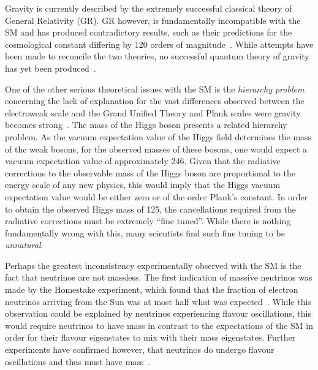 Gravity is currently described by the extremely successful classical theory of General Relativity (GR).
GR however, is fundamentally incompatible with the SM and  has produced contradictory results, such as their predictions for the cosmological constant differing by 120 orders of magnitude~\cite{Adler:1995vd}.
While attempts have been made to reconcile the two theories, no successful quantum theory of gravity has yet been produced~\cite{Sola:2013gha}.	

One of the other serious theoretical issues with the SM is the \emph{hierarchy problem} concerning the lack of explanation for the vast differences observed between the electroweak scale and the Grand Unified Theory and Plank scales were gravity becomes strong~\cite{Burdman:2007ck}.
The mass of the Higgs boson presents a related hierarchy problem.
As the vacuum expectation value of the Higgs field determines the mass of the weak bosons, for the observed masses of these bosons, one would expect a vacuum expectation value of approximately 246\GeV.
Given that the radiative corrections to the observable mass of the Higgs boson are proportional to the energy scale of any new physics, this would imply that the Higgs vacuum expectation value would be either zero or of the order Plank's constant.
In order to obtain the observed Higgs mass of 125\GeV, the cancellations required from the radiative corrections must be extremely ``fine tuned''.
While there is nothing fundamentally wrong with this, many scientists find such fine tuning to be \emph{unnatural}.


Perhaps the greatest inconsistency experimentally observed with the SM is the fact that neutrinos are not massless.
The first indication of massive neutrinos was made by the Homestake experiment, which found that the fraction of electron neutrinos arriving from the Sun was at most half what was expected~\cite{PhysRevLett.20.1205}.
While this observation could be explained by neutrinos experiencing flavour oscillations, this would require neutrinos to have mass in contrast to the expectations of the SM in order for their flavour eigenstates to mix with their mass eigenstates.
Further experiments have confirmed however, that neutrinos do undergo flavour oscillations and thus must have mass~\cite{Fukuda:1998mi,Ahmad:2001an,PhysRevD.88.032002}.

